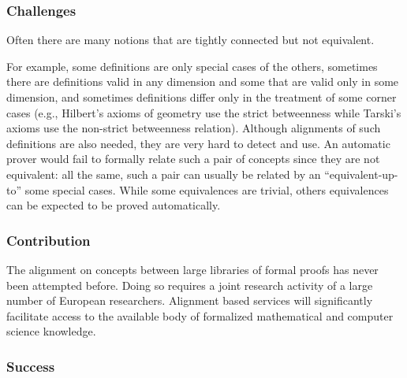 \subsubsection*{Challenges}

Often there are many notions that are tightly connected but not
equivalent.

For example, some definitions are only special cases of the others,
sometimes there are definitions valid in any dimension and some that
are valid only in some dimension, and sometimes definitions differ
only in the treatment of some corner cases (e.g., Hilbert's axioms of
geometry use the strict betweenness while Tarski's axioms use the
non-strict betweenness relation).  Although alignments of such
definitions are also needed, they are very hard to detect and use. An
automatic prover would fail to formally relate such a pair of concepts
since they are not equivalent: all the same, such a pair can usually
be related by an ``equivalent-up-to'' some special cases.  While some
equivalences are trivial, others equivalences can be expected to be
proved automatically.

\subsubsection*{Contribution}

The alignment on concepts between large libraries of formal proofs has
never been attempted before.  Doing so requires a joint research
activity of a large number of European researchers.  Alignment based
services will significantly
facilitate access to the available body of formalized mathematical and
computer science knowledge.

\subsubsection*{Success}

